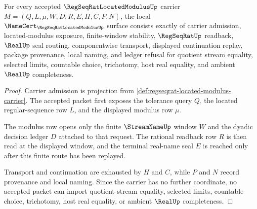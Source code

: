 \begin{theorem}
\label{thm:regseqrat-located-modulus-namecert-obligations}
For every accepted $\RegSeqRatLocatedModulusUp$ carrier $M=(Q,L,\mu,W,D,R,E,H,C,P,N)$, the local $\NameCert_{\RegSeqRatLocatedModulusUp}$ surface consists exactly of carrier admission, located-modulus exposure, finite-window stability, $\RegSeqRatUp$ readback, $\RealUp$ seal routing, componentwise transport, displayed continuation replay, package provenance, local naming, and ledger refusal for quotient stream equality, selected limits, countable choice, trichotomy, host real equality, and ambient $\RealUp$ completeness.
\end{theorem}
\begin{proof}
Carrier admission is projection from \autoref{def:regseqrat-located-modulus-carrier}. The accepted packet first exposes the tolerance query $Q$, the located regular-sequence row $L$, and the displayed modulus row $\mu$.

The modulus row opens only the finite $\StreamNameUp$ window $W$ and the dyadic decision ledger $D$ attached to that request. The rational readback row $R$ is then read at the displayed window, and the terminal real-name seal $E$ is reached only after this finite route has been replayed.

Transport and continuation are exhausted by $H$ and $C$, while $P$ and $N$ record provenance and local naming. Since the carrier has no further coordinate, no accepted packet can import quotient stream equality, selected limits, countable choice, trichotomy, host real equality, or ambient $\RealUp$ completeness.
\end{proof}

